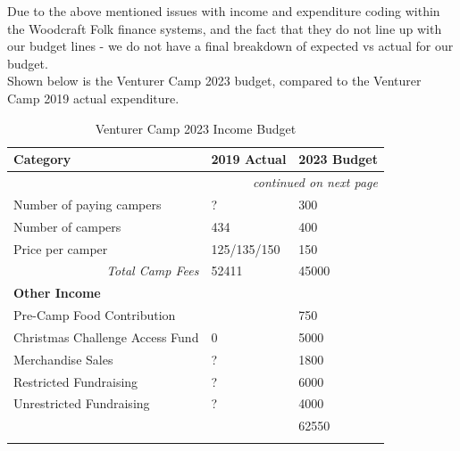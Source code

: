 Due to the above mentioned issues with income and expenditure coding within the Woodcraft Folk finance systems, and the fact that they do not line up with our budget lines - we do not have a final breakdown of expected vs actual for our budget.\\

Shown below is the Venturer Camp 2023 budget, compared to the Venturer Camp 2019 actual expenditure. 

{\RaggedRight \centering
    \begin{longtable}{p{} p{} p{}}
    \textbf{Category} & \textbf{2019 Actual} & \textbf{2023 Budget}\\
    \hline
    \hline
    \endhead

    \multicolumn{3}{r}{\footnotesize\itshape continued on next page}\\
    \endfoot 

    \endlastfoot

    Number of paying campers & ? & 300\\
    \hline
    Number of campers & 434 & 400\\
    \hline
    Price per camper & 125/135/150 & 150\\
    \hline
    \multicolumn{1}{r}{\textit{Total Camp Fees}} & 52411 & 45000\\
    \hline
    \multicolumn{3}{l}{\textbf{Other Income}}\\
    \hline
    Pre-Camp Food Contribution & & 750\\
    \hline
    Christmas Challenge Access Fund & 0 & 5000\\
    \hline
    Merchandise Sales & ? & 1800\\
    \hline
    Restricted Fundraising & ? & 6000\\
    \hline
    Unrestricted Fundraising & ? & 4000\\
    \hline
    \rowcolor{accent!60}
    \multicolumn{1}{r}{\textit{Total Income}} & & 62550\\
    \hline

    \caption{Venturer Camp 2023 Income Budget}
    \end{longtable}
} %


